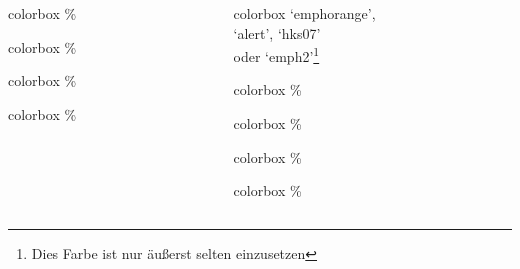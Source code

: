 \documentclass[german,notoc]{tudbeamer}%
\begin{document}
\begin{frame}
\begin{columns}[T,onlytextwidth]
\begin{column}{.19\textwidth}
			\begin{beamercolorbox}[wd=0.9\textwidth,sep=1em]{colorbox}
				\%
		    \end{beamercolorbox}
			\begin{beamercolorbox}[wd=0.9\textwidth,sep=1em]{colorbox}
				\%
		    \end{beamercolorbox}
			\begin{beamercolorbox}[wd=0.9\textwidth,sep=1em]{colorbox}
				\%
		    \end{beamercolorbox}
			\begin{beamercolorbox}[wd=0.9\textwidth,sep=1em]{colorbox}
				\%
		    \end{beamercolorbox}
		\end{column}
		\begin{column}{.19\textwidth}%
			\begin{beamercolorbox}[wd=0.9\textwidth,sep=1em]{colorbox}
				\centering `emphorange',\\ `alert', `hks07'\\ oder `emph2'\footnote[frame]{Dies Farbe ist nur äußerst selten einzusetzen}
		    \end{beamercolorbox}
			\begin{beamercolorbox}[wd=0.9\textwidth,sep=1em]{colorbox}
				\%
		    \end{beamercolorbox}
			\begin{beamercolorbox}[wd=0.9\textwidth,sep=1em]{colorbox}
				\%
		    \end{beamercolorbox}
			\begin{beamercolorbox}[wd=0.9\textwidth,sep=1em]{colorbox}
				\%
		    \end{beamercolorbox}
			\begin{beamercolorbox}[wd=0.9\textwidth,sep=1em]{colorbox}
				\%
		    \end{beamercolorbox}
		\end{column}
	\end{columns}
\end{frame}
\end{document}
